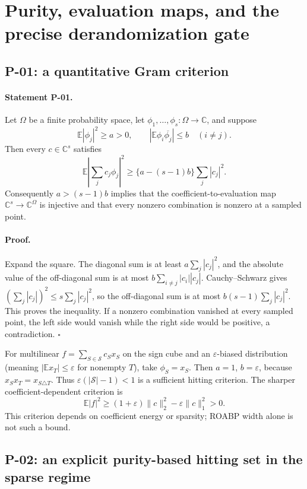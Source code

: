 \documentclass[11pt,a4paper]{article}
\theoremstyle{definition}\newtheorem{definition}{Definition}
\begin{document}
\section{Purity, evaluation maps, and the precise derandomization gate}

\subsection{P-01: a quantitative Gram criterion}
\paragraph{Statement P-01.}
Let $\Omega$ be a finite probability space, let $\phi_1,\ldots,\phi_s:\Omega\to\mathbb C$, and suppose
\[
 \mathbb E|\phi_j|^2\ge a>0,\qquad
 |\mathbb E\phi_i\overline{\phi_j}|\le b\quad(i\ne j).
\]
Then every $c\in\mathbb C^s$ satisfies
\[
 \mathbb E\left|\sum_jc_j\phi_j\right|^2
 \ge \{a-(s-1)b\}\sum_j|c_j|^2.
\]
Consequently $a>(s-1)b$ implies that the coefficient-to-evaluation map $\mathbb C^s\to\mathbb C^\Omega$ is injective and that every nonzero combination is nonzero at a sampled point.
\paragraph{Proof.}
Expand the square. The diagonal sum is at least $a\sum_j|c_j|^2$, and the absolute value of the off-diagonal sum is at most $b\sum_{i\ne j}|c_i||c_j|$. Cauchy--Schwarz gives $(\sum_j|c_j|)^2\le s\sum_j|c_j|^2$, so the off-diagonal sum is at most $b(s-1)\sum_j|c_j|^2$. This proves the inequality. If a nonzero combination vanished at every sampled point, the left side would vanish while the right side would be positive, a contradiction. $\square$

For multilinear $f=\sum_{S\in\mathcal S}c_Sx_S$ on the sign cube and an $\varepsilon$-biased distribution (meaning $|\mathbb E x_T|\le\varepsilon$ for nonempty $T$), take $\phi_S=x_S$. Then $a=1$, $b=\varepsilon$, because $x_Sx_T=x_{S\triangle T}$. Thus $\varepsilon(|\mathcal S|-1)<1$ is a sufficient hitting criterion. The sharper coefficient-dependent criterion is
\[
 \mathbb E|f|^2\ge (1+\varepsilon)\|c\|_2^2-\varepsilon\|c\|_1^2>0.
\]
This criterion depends on coefficient energy or sparsity; ROABP width alone is not such a bound.

\subsection{P-02: an explicit purity-based hitting set in the sparse regime}
\end{document}
